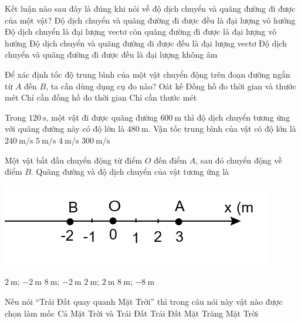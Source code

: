 \begin{ex}
	Kết luận nào sau đây là đúng khi nói về độ dịch chuyển và quãng đường đi được của một vật?
	\choice
	{Độ dịch chuyển và quãng đường đi được đều là đại lượng vô hướng}
	{\True Độ dịch chuyển là đại lượng vectơ còn quãng đường đi được là đại lượng vô hướng}
	{Độ dịch chuyển và quãng đường đi được đều là đại lượng vectơ}
	{Độ dịch chuyển và quãng đường đi được đều là đại lượng không âm}
	\loigiai{
	}
\end{ex}

\begin{ex}
	Để xác định tốc độ trung bình của một vật chuyển động trên đoạn đường ngắn từ $A$ đến $B$, ta cần dùng dụng cụ đo nào?
	\choice
	{Oát kế}
	{\True Đồng hồ đo thời gian và thước mét}
	{Chỉ cần đồng hồ đo thời gian}
	{Chỉ cần thước mét}
	\loigiai{}
\end{ex}

\begin{ex}
	Trong $\SI{120}{\second}$, một vật đi được quãng đường $\SI{600}{\meter}$ thì độ dịch chuyển tương ứng với quãng đường này có độ lớn là $\SI{480}{\meter}$. Vận tốc trung bình của vật có độ lớn là
	\choice
	{$\SI{240}{\meter/\second}$}
	{$\SI{5}{\meter/\second}$}
	{\True $\SI{4}{\meter/\second}$}
	{$\SI{300}{\meter/\second}$}
	\loigiai{}
\end{ex}

\begin{ex}
	Một vật bắt đầu chuyển động từ điểm $O$ đến điểm $A$, sau đó chuyển động về điểm $B$. Quãng đường và độ dịch chuyển của vật tương ứng là
	\begin{center}
		\includegraphics[scale=0.5]{figs/G10Y25B3-7}
	\end{center}
	\choice
	{$\SI{2}{\meter}$; $\SI{-2}{\meter}$}
	{\True $\SI{8}{\meter}$; $\SI{-2}{\meter}$}
	{$\SI{2}{\meter}$; $\SI{2}{\meter}$}
	{$\SI{8}{\meter}$; $\SI{-8}{\meter}$}
	\loigiai{
	}
\end{ex}

\begin{ex}
	Nếu nói “Trái Đất quay quanh Mặt Trời” thì trong câu nói này vật nào được chọn làm mốc
	\choice
	{Cả Mặt Trời và Trái Đất}
	{Trái Đất}
	{Mặt Trăng}
	{\True Mặt Trời}
	\loigiai{
	}
\end{ex}

